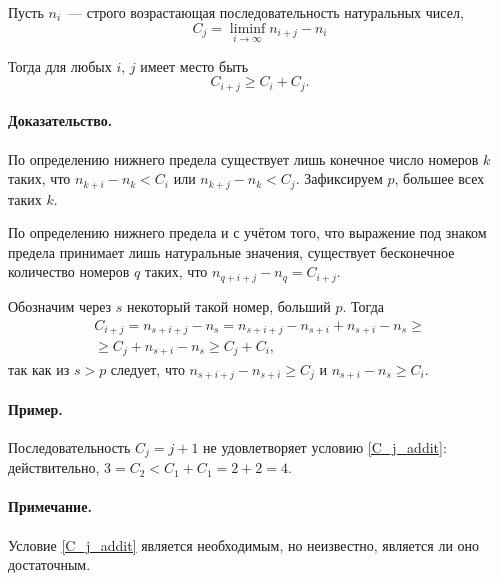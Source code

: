 
Пусть $n_i$~--- строго возрастающая последовательность натуральных чисел,
\begin{equation}
	C_j = \liminf_{i\to\infty} n_{i+j} - n_i
\end{equation}

Тогда для любых $i$, $j$ имеет место быть
\begin{equation}\label{C_j_addit}
	C_{i+j} \geq C_i + C_j
	.
\end{equation}
\paragraph{Доказательство.}
По определению нижнего предела существует лишь конечное число номеров $k$
таких, что $n_{k+i} - n_k < C_i$ или $n_{k+j} - n_k < C_j$.
Зафиксируем $p$, большее всех таких $k$.

По определению нижнего предела и с учётом того, что выражение под знаком предела
принимает лишь натуральные значения,
существует бесконечное количество номеров $q$ таких, что $n_{q+i+j} - n_q = C_{i+j}$.

Обозначим через $s$ некоторый такой номер, больший $p$.
Тогда
\begin{multline}
	C_{i+j} = n_{s+i+j} - n_s = n_{s+i+j} - n_{s+i} + n_{s+i} - n_s
	\geq \\
	\geq C_j + n_{s+i} - n_s \geq C_j + C_i,
\end{multline}
так как из $s>p$ следует, что $n_{s+i+j} - n_{s+i} \geq C_j$ и $n_{s+i} - n_s \geq C_i$.

\paragraph{Пример.}
Последовательность $C_j = j+1$ не удовлетворяет условию \eqref{C_j_addit}:
действительно, $3=C_2 < C_1+C_1 = 2+2 = 4$.

\paragraph{Примечание.}
Условие \eqref{C_j_addit} является необходимым, но неизвестно, является ли оно достаточным.
